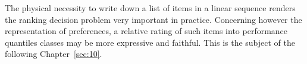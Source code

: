 \vspace{1cm}
The physical necessity to write down a list of items in a linear sequence renders the ranking decision problem very important in practice. Concerning however the representation of preferences, a relative rating of such items into performance quantiles classes may be more expressive and faithful. This is the subject of the following Chapter~\ref{sec:10}.


\clearpage


%